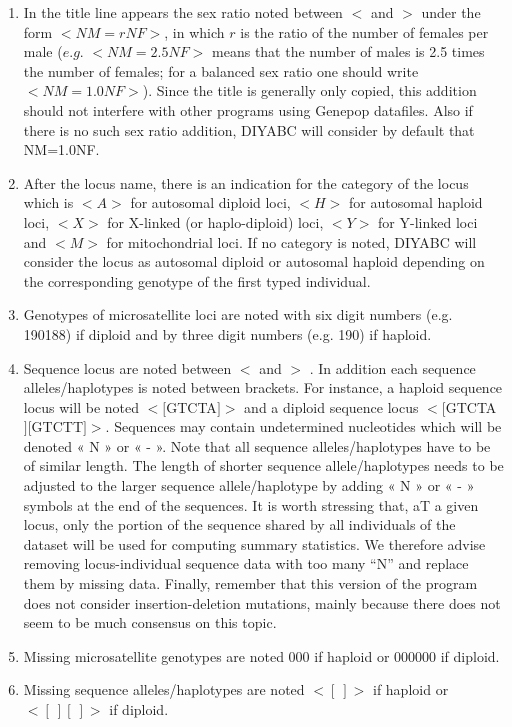 \begin{enumerate}
\item In the title line appears the sex ratio noted between \textsf{$<$}
and \textsf{$>$} under the form \textsf{$<NM=rNF>$}, in which $r$
is the ratio of the number of females per male ($e.g.$ \textsf{$<NM=2.5NF>$}
means that the number of males is 2.5 times the number of females;
for a balanced sex ratio one should write\textsf{ $<NM=1.0NF>$}).
Since the title is generally only copied, this addition should not
interfere with other programs using Genepop datafiles. Also if there
is no such sex ratio addition, DIYABC will consider by default that
NM=1.0NF.
\item After the locus name, there is an indication for the category of the
locus which is $<A>$ for autosomal diploid loci, $<H>$ for autosomal
haploid loci, $<X>$ for X-linked (or haplo-diploid) loci, $<Y>$
for Y-linked loci and $<M>$ for mitochondrial loci. If no category
is noted, DIYABC will consider the locus as autosomal diploid or autosomal
haploid depending on the corresponding genotype of the first typed
individual.
\item Genotypes of microsatellite loci are noted with six digit numbers
(e.g. 190188) if diploid and by three digit numbers (e.g. 190) if
haploid.
\item Sequence locus are noted between \textsf{$<$} and \textsf{$>$} .
In addition each sequence alleles/haplotypes is noted between brackets.
For instance, a haploid sequence locus will be noted $<[$GTCTA$]>$
and a diploid sequence locus $<[$GTCTA$][$GTCTT$]>$. Sequences
may contain undetermined nucleotides which will be denoted « N »
or « - ». Note that all sequence alleles/haplotypes have to be of
similar length. The length of shorter sequence allele/haplotypes needs
to be adjusted to the larger sequence allele/haplotype by adding «
N » or « - » symbols at the end of the sequences. It is worth stressing
that, aT a given locus, only the portion of the sequence shared by
all individuals of the dataset will be used for computing summary
statistics. We therefore advise removing locus-individual sequence
data with too many ``N'' and replace them by missing data. Finally,
remember that this version of the program does not consider insertion-deletion
mutations, mainly because there does not seem to be much consensus
on this topic.
\item Missing microsatellite genotypes are noted \textsf{000} if haploid
or \textsf{000000} if diploid.
\item Missing sequence alleles/haplotypes are noted $<[\ ]>$ if haploid
or $<[\ ][\ ]>$ if diploid.
\end{enumerate}
